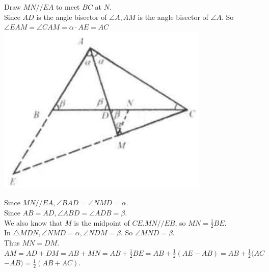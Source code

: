 \documentclass{article}
\begin{document}
Draw \(M N / / E A\) to meet \(B C\) at \(N\).\\
Since \(A D\) is the angle bisector of \(\angle A, A M\) is the angle bisector of \(\angle A\). So \(\angle E A M=\angle C A M=\alpha \cdot A E=A C\)\\
\centering
\includegraphics[width=\textwidth]{images/058.jpg}

Since \(M N / / E A, \angle B A D=\angle N M D=\alpha\).\\
Since \(A B=A D, \angle A B D=\angle A D B=\beta\).\\
We also know that \(M\) is the midpoint of \(C E . M N / / E B\), so \(M N=\frac{1}{2} B E\).\\
In \(\triangle M D N, \angle N M D=\alpha, \angle N D M=\beta\). So \(\angle M N D=\beta\).\\
Thus \(M N=D M\).\\
\(A M=A D+D M=A B+M N=A B+\frac{1}{2} B E=A B+\frac{1}{2}(A E-A B)=A B+\frac{1}{2}(A C\) \(-A B)=\frac{1}{2}(A B+A C)\).
\end{document}
